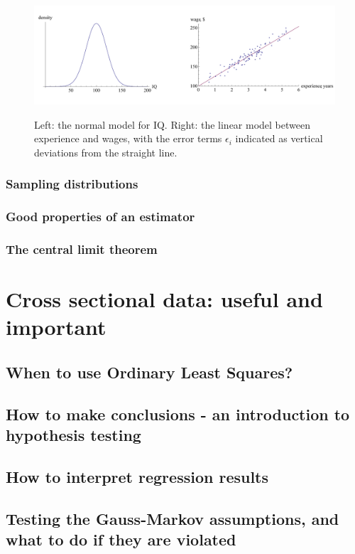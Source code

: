 \documentclass[11pt,fullpage]{book}
\begin{document}
\begin{figure}
\centering
\scalebox{0.4} 
{\includegraphics{Estimators_normalIQLinearWage.pdf}}
\caption{Left: the normal model for IQ. Right: the linear model between experience and wages, with the error terms $\epsilon_i$ indicated as vertical deviations from the straight line.}\label{fig:Estimators_normalIQLinearWage}
\end{figure}

\section{Sampling distributions}
\section{Good properties of an estimator}
\section{The central limit theorem}\label{sec:Estimators_CLT}

\part{Cross sectional data: useful and important}
\chapter{When to use Ordinary Least Squares?}
\chapter{How to make conclusions - an introduction to hypothesis testing}
\chapter{How to interpret regression results}
\chapter{Testing the Gauss-Markov assumptions, and what to do if they are violated}
\end{document}
